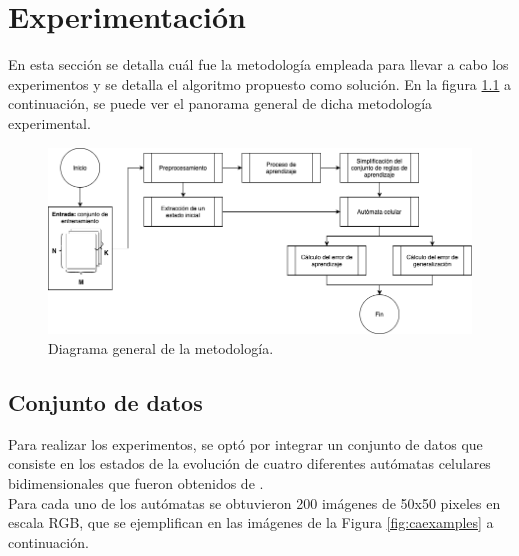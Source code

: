 \chapter{Experimentación}

En esta sección se detalla cuál fue la metodología empleada para llevar a cabo los experimentos y se detalla el algoritmo propuesto como solución. En la figura \ref{fig:metodologia} a continuación, se puede ver el panorama general de dicha metodología experimental.\\

\begin{figure}[H]
	\centering
	\includegraphics[width=\linewidth]{fig/metodologia}
	\caption{Diagrama general de la metodología.}
	\label{fig:metodologia}
\end{figure}

\section{Conjunto de datos}

Para realizar los experimentos, se optó por integrar un conjunto de datos que consiste en los estados de la evolución de cuatro diferentes autómatas celulares bidimensionales que fueron obtenidos de \cite{rucker_walker}.
\\

Para cada uno de los autómatas se obtuvieron 200 imágenes de 50x50 pixeles en escala RGB, que se ejemplifican en las imágenes de la Figura \ref{fig:caexamples} a continuación.


